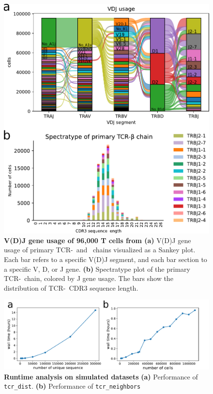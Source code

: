 \documentclass{article}
\begin{document}
\newpage
\begin{figure}[!ht]
  \centering
  \includegraphics[width=7in]{../figures/gene_usage.pdf}
  \caption{\textbf{V(D)J gene usage of 96,000 T cells from \textcite{Wu2020-vp}} \textbf{(a)} V(D)J gene usage of primary TCR-\textalpha\ and \textbeta\ chains visualized as a Sankey plot. Each bar refers to a specific V(D)J segment, and each bar section to a specific V, D, or J gene. \textbf{(b)} Spectratype plot of the primary TCR-\textbeta\ chain, colored by J gene usage. The bars show the distribution of TCR-\textbeta\ CDR3 sequence length.}
\end{figure}

\newpage
\begin{figure}[!ht]
  \centering
  \includegraphics[width=7in]{../figures/runtime.pdf}
  \caption{\textbf{Runtime analysis on simulated datasets} \textbf{(a)} Performance of \texttt{tcr\_dist}. \textbf{(b)} Performance of \texttt{tcr\_neighbors}}
\end{figure}
\end{document}
